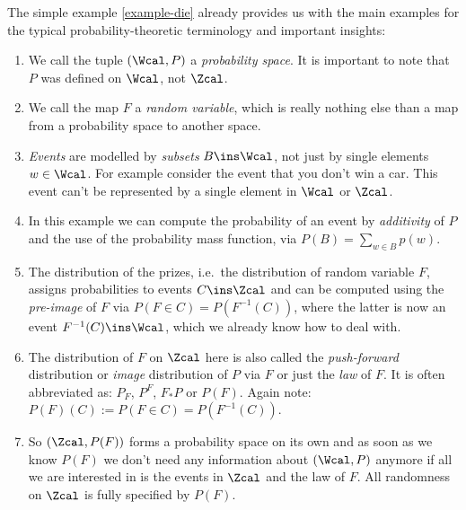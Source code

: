 \begin{Disc}%
    The simple example \ref{example-die} already provides us with the main examples for the typical 
    probability-theoretic terminology and important insights:
    \begin{enumerate}
        \item We call the tuple $(\Wcal,P)$ a \emph{probability space}. It is important to note that $P$ was defined on $\Wcal$, not $\Zcal$.
        \item We call the map $F$ a \emph{random variable}, which is really nothing else than a map from a probability space to another space.
        \item \emph{Events} are modelled by \emph{subsets} $B \ins \Wcal$, not just by single elements $w \in \Wcal$. For example consider the event that you don't win a car. This event can't be represented by a single element in $\Wcal$ or $\Zcal$.
        \item In this example we can compute the probability of an event by \emph{additivity} of $P$ and the use of the probability mass function,
            via $P(B) = \sum_{ w \in B} p(w)$.
        \item The distribution of the prizes, i.e.\ the distribution of random variable $F$, assigns 
               probabilities to events $C \ins \Zcal$ and can be computed using the \emph{pre-image} of $F$ 
               via $P(F \in C) = P(F^{-1}(C))$, where the latter is now an event $F^{-1}(C) \ins \Wcal$, 
               which we already know how to deal with. 
           \item The distribution of $F$ on $\Zcal$ here is also called the \emph{push-forward} distribution or \emph{image} distribution 
            of $P$ via $F$ or just the \emph{law} of $F$. It is often abbreviated as: $P_F$, $P^F$, $F_*P$ or $P(F)$. 
            Again note: $P(F)(C) := P(F \in C)= P(F^{-1}(C))$.
        \item So $(\Zcal,P(F))$ forms a probability space on its own and as soon as we know $P(F)$ we don't need any information about $(\Wcal,P)$ anymore if all we are interested in is the events in $\Zcal$ and the law of $F$. All randomness on $\Zcal$ is fully specified by $P(F)$.
    \end{enumerate}
\end{Disc}

